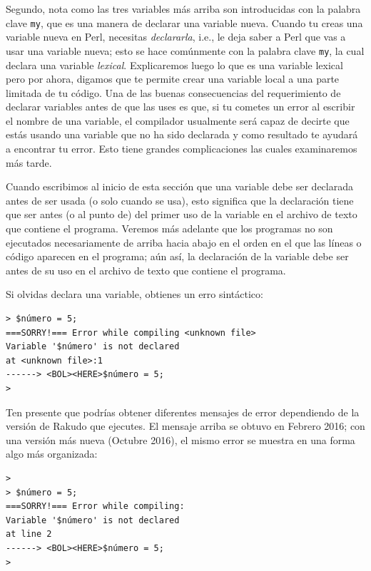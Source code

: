 Segundo, nota como las tres variables más arriba son 
introducidas con la palabra clave {\tt my}, que es una manera
de declarar una variable nueva. Cuando tu creas una variable nueva
en Perl, necesitas \emph{declararla}, i.e., le deja saber a Perl
que vas a usar una variable nueva; esto se hace comúnmente con la
palabra clave {\tt my}, la cual declara una variable \emph{lexical}.
Explicaremos luego lo que es una variable lexical pero por ahora,
digamos que te permite crear una variable local a una parte 
limitada de tu código. Una de las buenas consecuencias del requerimiento
de declarar variables antes de que las uses es que, si tu cometes
un error al escribir el nombre de una variable, el compilador 
usualmente será capaz de decirte que estás usando una variable que
no ha sido declarada y como resultado te ayudará a encontrar tu error. 
Esto tiene grandes complicaciones las cuales examinaremos más tarde.

Cuando escribimos al inicio de esta sección que una variable debe
ser declarada antes de ser usada (o solo cuando se usa), esto
significa que la declaración tiene que ser antes (o al punto de) 
del primer uso de la variable en el archivo de texto que contiene el 
programa. Veremos más adelante que los programas no son ejecutados
necesariamente de arriba hacia abajo en el orden en el que las líneas
o código aparecen en el programa; aún así, la declaración de la variable
debe ser antes de su uso en el archivo de texto que contiene el programa.

Si olvidas declara una variable, obtienes un erro sintáctico:

\begin{verbatim}
> $número = 5;
===SORRY!=== Error while compiling <unknown file>
Variable '$número' is not declared
at <unknown file>:1
------> <BOL><HERE>$número = 5;
>
\end{verbatim}
%
Ten presente que podrías obtener diferentes mensajes de
error dependiendo de la versión de Rakudo que ejecutes.
El mensaje arriba se obtuvo en Febrero 2016;
con una versión más nueva (Octubre 2016), el mismo error
se muestra en una forma algo más organizada:
\begin{verbatim}
>
> $número = 5;
===SORRY!=== Error while compiling:
Variable '$número' is not declared
at line 2
------> <BOL><HERE>$número = 5;
>
\end{verbatim}


